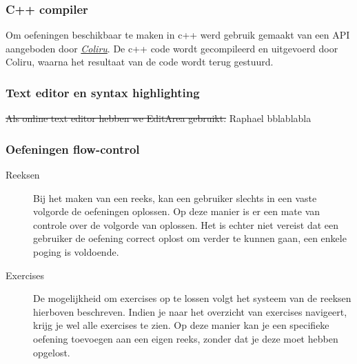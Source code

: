 \subsubsection{C++ compiler}
Om oefeningen beschikbaar te maken in c++ werd gebruik gemaakt van een API aangeboden door
\href{http://coliru.stacked-crooked.com/}{\emph{Coliru}}. De c++ code wordt gecompileerd en uitgevoerd door Coliru,
waarna het resultaat van de code wordt terug gestuurd.

\subsubsection{Text editor en syntax highlighting}
\st{Als online text editor hebben we EditArea gebruikt.}
Raphael
bblablabla

\subsubsection{Oefeningen flow-control}
\begin{description}
\item[Reeksen] Bij het maken van een reeks, kan een gebruiker slechts in een vaste volgorde de oefeningen oplossen. Op deze manier is er
een mate van controle over de volgorde van oplossen. Het is echter niet vereist dat een gebruiker de oefening correct oplost
om verder te kunnen gaan, een enkele poging is voldoende.
\item[Exercises] De mogelijkheid om exercises op te lossen volgt het systeem van de reeksen hierboven beschreven. Indien je naar het
    overzicht van exercises navigeert, krijg je wel alle exercises te zien. Op deze manier kan je een specifieke oefening toevoegen 
    aan een eigen reeks, zonder dat je deze moet hebben opgelost.
\end{description}

